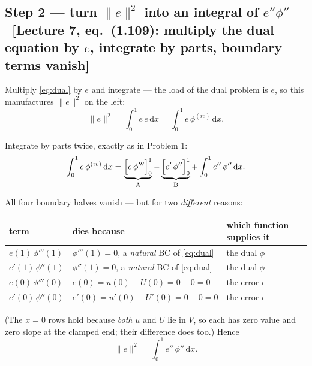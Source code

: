 \documentclass[11pt]{article}
\newcommand{\dx}{\,\mathrm{d}x}
\newcommand{\norm}[1]{\lVert #1\rVert}
\newcommand{\src}[1]{{\small\color{black!55}\textsf{[#1]}}}
\begin{document}
\subsection*{Step 2 --- turn $\norm{e}^{2}$ into an integral of $e''\phi''$
  \ \src{Lecture 7, eq.~(1.109): multiply the dual equation by $e$, integrate by
         parts, boundary terms vanish}}

\begin{steps}
\item Multiply \eqref{eq:dual} by $e$ and integrate --- the load of the dual
      problem is $e$, so this manufactures $\norm{e}^{2}$ on the left:
\[
  \norm{e}^{2}=\int_{0}^{1}e\,e\dx=\int_{0}^{1}e\,\phi^{(iv)}\dx .
\]
\item Integrate by parts twice, exactly as in Problem 1:
\begin{equation}\label{eq:dualibp}
  \int_{0}^{1}e\,\phi^{(iv)}\dx
   =\underbrace{\Bigl[e\,\phi'''\Bigr]_{0}^{1}}_{\text{A}}
   -\underbrace{\Bigl[e'\,\phi''\Bigr]_{0}^{1}}_{\text{B}}
   +\int_{0}^{1}e''\,\phi''\dx .
\end{equation}
\item All four boundary halves vanish --- but for two \emph{different} reasons:
\end{steps}

\begin{center}\small
\renewcommand{\arraystretch}{1.3}
\begin{tabular}{@{}lll@{}}
\toprule
term & dies because & which function supplies it\\
\midrule
$e(1)\,\phi'''(1)$ & $\phi'''(1)=0$, a \emph{natural} BC of \eqref{eq:dual} & the dual $\phi$\\
$e'(1)\,\phi''(1)$ & $\phi''(1)=0$, a \emph{natural} BC of \eqref{eq:dual} & the dual $\phi$\\
$e(0)\,\phi'''(0)$ & $e(0)=u(0)-U(0)=0-0=0$ & the error $e$\\
$e'(0)\,\phi''(0)$ & $e'(0)=u'(0)-U'(0)=0-0=0$ & the error $e$\\
\bottomrule
\end{tabular}
\end{center}

\begin{steps}
\item (The $x=0$ rows hold because \emph{both} $u$ and $U$ lie in $V$, so each
      has zero value and zero slope at the clamped end; their difference does
      too.)  Hence
\begin{equation}\label{eq:esq}
  \norm{e}^{2}=\int_{0}^{1}e''\,\phi''\dx .
\end{equation}
\end{steps}
\end{document}
